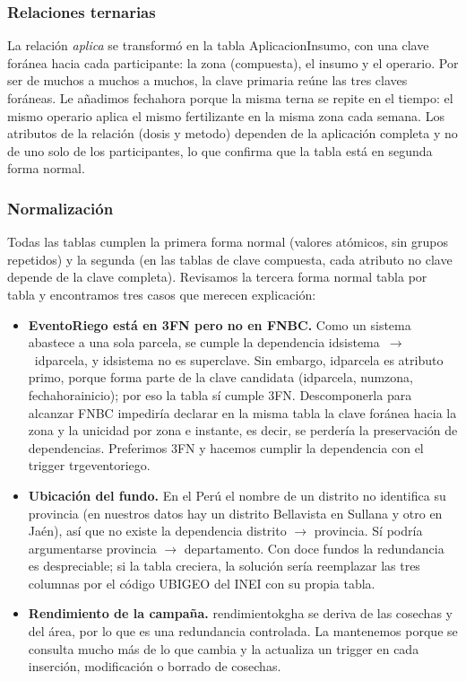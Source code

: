 \documentclass[11pt,letterpaper]{article}
\newcommand{\tbus}{\textunderscore\allowbreak}
\newcommand{\tb}[1]{{\ttfamily\let\_\tbus #1}}
\begin{document}
\subsubsection{Relaciones ternarias}

La relación \emph{aplica} se transformó en la tabla \tb{Aplicacion\_Insumo}, con una clave foránea hacia cada participante: la zona (compuesta), el insumo y el operario. Por ser de muchos a muchos a muchos, la clave primaria reúne las tres claves foráneas. Le añadimos \tb{fecha\_hora} porque la misma terna se repite en el tiempo: el mismo operario aplica el mismo fertilizante en la misma zona cada semana. Los atributos de la relación (\tb{dosis} y \tb{metodo}) dependen de la aplicación completa y no de uno solo de los participantes, lo que confirma que la tabla está en segunda forma normal.

\subsubsection{Normalización}

Todas las tablas cumplen la primera forma normal (valores atómicos, sin grupos repetidos) y la segunda (en las tablas de clave compuesta, cada atributo no clave depende de la clave completa). Revisamos la tercera forma normal tabla por tabla y encontramos tres casos que merecen explicación:

\begin{itemize}[leftmargin=1.4em,itemsep=0.2em]
\item \textbf{\tb{Evento\_Riego} está en 3FN pero no en FNBC.} Como un sistema abastece a una sola parcela, se cumple la dependencia \tb{id\_sistema}~$\to$~\tb{id\_parcela}, y \tb{id\_sistema} no es superclave. Sin embargo, \tb{id\_parcela} es atributo primo, porque forma parte de la clave candidata (\tb{id\_parcela}, \tb{num\_zona}, \tb{fecha\_hora\_inicio}); por eso la tabla sí cumple 3FN. Descomponerla para alcanzar FNBC impediría declarar en la misma tabla la clave foránea hacia la zona y la unicidad por zona e instante, es decir, se perdería la preservación de dependencias. Preferimos 3FN y hacemos cumplir la dependencia con el trigger \tb{trg\_evento\_riego}.
\item \textbf{Ubicación del fundo.} En el Perú el nombre de un distrito no identifica su provincia (en nuestros datos hay un distrito Bellavista en Sullana y otro en Jaén), así que no existe la dependencia distrito $\to$ provincia. Sí podría argumentarse provincia $\to$ departamento. Con doce fundos la redundancia es despreciable; si la tabla creciera, la solución sería reemplazar las tres columnas por el código UBIGEO del INEI con su propia tabla.
\item \textbf{Rendimiento de la campaña.} \tb{rendimiento\_kg\_ha} se deriva de las cosechas y del área, por lo que es una redundancia controlada. La mantenemos porque se consulta mucho más de lo que cambia y la actualiza un trigger en cada inserción, modificación o borrado de cosechas.
\end{itemize}
\end{document}
